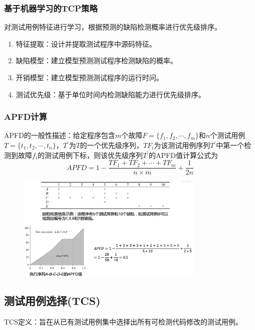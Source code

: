 \subsubsection{基于机器学习的TCP策略}
对测试用例特征进行学习，根据预测的缺陷检测概率进行优先级排序。
\begin{enumerate}[label=\arabic*.]
    \item 特征提取：设计并提取测试程序中源码特征。
    \item 缺陷模型：建立模型预测测试程序检测缺陷的概率。
    \item 开销模型：建立模型预测测试程序的运行时问。
    \item 测试优先级：基于单位时间内检测缺陷能力进行优先级排序。
\end{enumerate}

\subsubsection{APFD计算}
APFD的一般性描述：给定程序包含$m$个故障$F=\{f_1,f_2,\cdots, f_m\}$和$n$个测试用例$T=\{t_1,t_2,\cdots, t_n\}$，$T^ \prime$为$T$的一个优先级序列，$TF_i$为该测试用例序列$T^ \prime$中第一个检测到故障$f_i$的测试用例下标，则该优先级序列$T^ \prime$的APFD值计算公式为
$$APFD=1- \frac{TF_1 + TF_2 +\cdots + TF_m}{n\times m} + \frac{1}{2n}$$

\begin{figure}[H]
    \vspace{-0.5em}
	\centering
	\includegraphics[width=0.8\textwidth]{images/APFD.png}
    \vspace{-1em}
\end{figure}

\subsection{测试用例选择(TCS)}
TCS定义：旨在从已有测试用例集中选择出所有可检测代码修改的测试用例。

